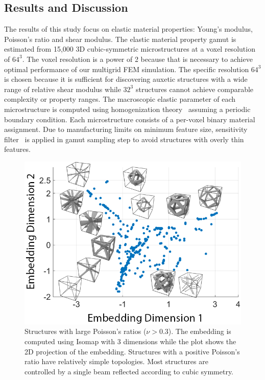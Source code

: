 \subsection{Results and Discussion}
The results of this study focus on elastic material properties: Young's modulus, Poisson's ratio and shear modulus.
The elastic material property gamut is estimated from 15,000 3D cubic-symmetric microstructures at a voxel resolution of $64^3$.
The voxel resolution is a power of 2 because that is necessary to achieve optimal performance of our multigrid FEM simulation.
The specific resolution $64^3$ is chosen because it is sufficient for discovering auxetic structures with a wide range of relative shear modulus while $32^3$ structures cannot achieve comparable complexity or property ranges.
The macroscopic elastic parameter of each microstructure is computed using homogenization theory~\citep{Guedes1990,xia:2015:design} assuming a periodic boundary condition.
Each microstructure consists of a per-voxel binary material assignment. Due to manufacturing limits on minimum feature size,
sensitivity filter~\citep{sigmund:2007} is applied in gamut sampling step to avoid structures with overly thin features.
\begin{figure}
	\centering
	\includegraphics[width=0.5\columnwidth]{images/pprFamily.png}
	\caption{Structures with large Poisson's ratios ($\nu>0.3$). The embedding is computed using Isomap with 3 dimensions while the plot shows the 2D projection of the embedding. Structures with a positive Poisson's ratio have relatively simple topologies. Most structures are controlled by a single beam reflected according to cubic symmetry.}
	\label{fig:pprfamilies}
\end{figure}
